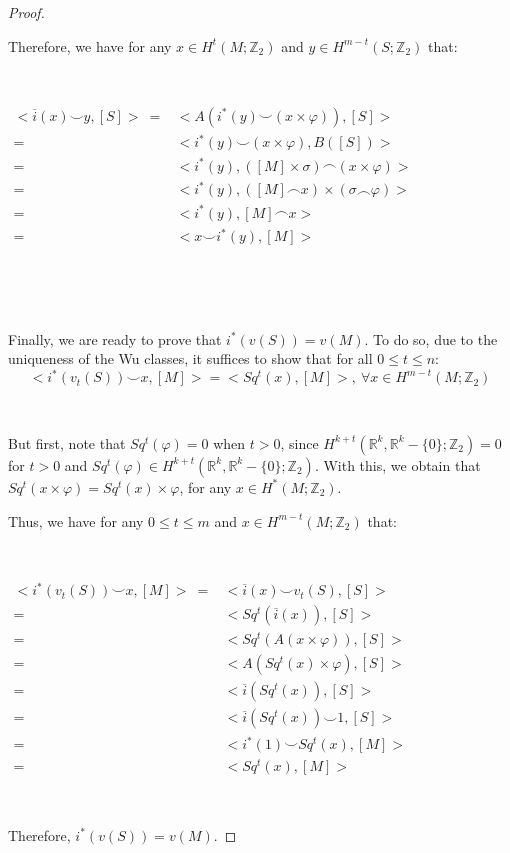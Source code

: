 \documentclass[12pt,oneside]{book}
\newcommand{\R}{\mathbb{R}}
\newcommand{\Z}{\mathbb{Z}}
\newcommand{\ccup}{\smile}
\newcommand{\ccap}{\frown}
\begin{document}
\begin{proof}
        \

        Therefore, we have for any $x\in H^{t}(M;\Z_{2})$ and $y\in H^{m-t}(S;\Z_{2})$ that:

        \

        $ \begin{array}{rl}
        	<\overline{i}(x)\ccup y,[S]> \ = & <A(i^{*}(y)\ccup (x\times\varphi)),[S]> \\
        	= & <i^{*}(y)\ccup (x\times\varphi),B([S])> \\
        	= & <i^{*}(y),([M]\times\sigma)\ccap (x\times\varphi)> \\
        	= & <i^{*}(y),([M]\ccap x)\times (\sigma\ccap\varphi)> \\
        	= & <i^{*}(y),[M]\ccap x> \\
        	= & <x\ccup i^{*}(y),[M]>
        \end{array} $

        \

        \

        Finally, we are ready to prove that $i^{*}(v(S))=v(M)$. To do so, due to the uniqueness of the Wu classes, it 
        suffices to show that for all $0\leq t\leq n$:
        $$ <i^{*}(v_{t}(S))\ccup x,[M]>=<Sq^{t}(x),[M]>, \ \forall x\in H^{m-t}(M;\Z_{2}) $$

        \

        But first, note that $Sq^{t}(\varphi)=0$ when $t>0$, since $H^{k+t}(\R^{k},\R^{k}-\{0\};\Z_{2})=0$ for $t>0$ and 
        $Sq^{t}(\varphi)\in H^{k+t}(\R^{k},\R^{k}-\{0\};\Z_{2})$. With this, we obtain that $Sq^{t}(x\times \varphi)=Sq^{t}(x)\times\varphi$, 
        for any $x\in H^{*}(M;\Z_{2})$.

        Thus, we have for any $0\leq t\leq m$ and $x\in H^{m-t}(M;\Z_{2})$ that:

        \

        $ \begin{array}{rl}
        	<i^{*}(v_{t}(S))\ccup x,[M]> \ = & <\overline{i}(x)\ccup v_{t}(S),[S]> \\
        	= & <Sq^{t}(\overline{i}(x)),[S]> \\
        	= & <Sq^{t}(A(x\times\varphi)),[S]> \\
        	= & <A(Sq^{t}(x)\times\varphi),[S]> \\
        	= & <\overline{i}(Sq^{t}(x)),[S]> \\
        	= & <\overline{i}(Sq^{t}(x))\ccup 1,[S]> \\
        	= & <i^{*}(1)\ccup Sq^{t}(x),[M]> \\
        	= & <Sq^{t}(x),[M]>
        \end{array} $

        \

        Therefore, $i^{*}(v(S))=v(M)$.

    \end{proof}
\end{document}
